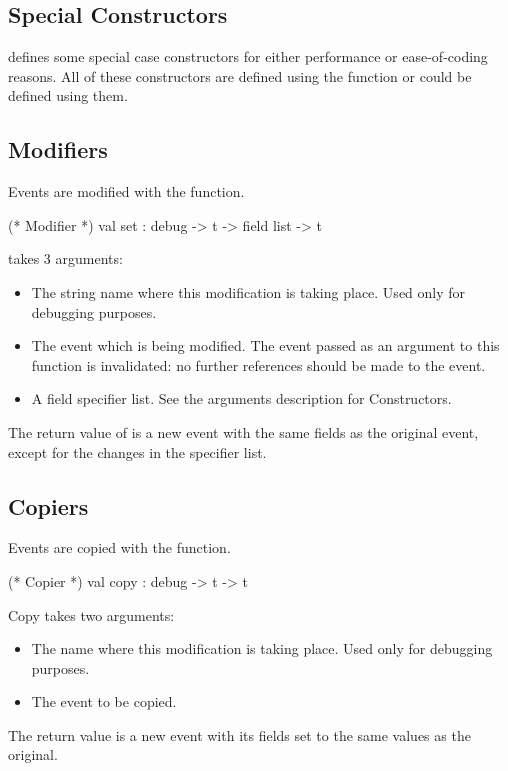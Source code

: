 \subsection{Special Constructors}
 defines some special case constructors for either
performance or ease-of-coding reasons.  All of these constructors are defined
using the  function or could be defined using them.

\subsection{Modifiers}
Events are modified with the  function.

\begin{codebox}
  (* Modifier *)
val set		: debug -> t -> field list -> t
\end{codebox}

 takes 3 arguments:
\begin{itemize}
\item
The string name where this modification is taking place.  Used only for
debugging purposes.
\item
The event which is being modified.  The event passed as an argument to this
function is invalidated: no further references should be made to the event.
\item
A field specifier list.  See the arguments description for Constructors.
\end{itemize}
The return value of  is a new event with the same fields as the
original event, except for the changes in the specifier list.

\subsection{Copiers}
Events are copied with the  function.

\begin{codebox}
  (* Copier *)
val copy	: debug -> t -> t
\end{codebox}

Copy takes two arguments:
\begin{itemize}
\item
The name where this modification is taking place.  Used only for debugging
purposes.
\item
The event to be copied.
\end{itemize}
The return value is a new event with its fields set to the same values as
the original.

